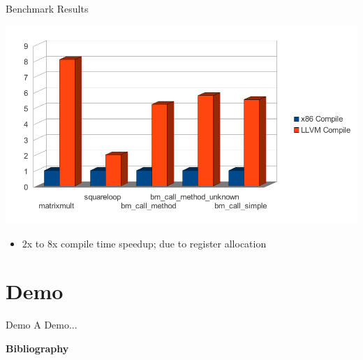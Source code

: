 \documentclass{beamer}
\begin{document}
\begin{frame}{Benchmark Results}
  \begin{center}
    \includegraphics[scale=.63]{./include/pdf/compiletime.pdf}
  \end{center}
  \begin{itemize}
  \item $2$x to $8$x compile time speedup\pause; due to register allocation
  \end{itemize}
\end{frame}

\section{Demo}

\begin{frame}{Demo}
  A Demo...
\end{frame}

\begin{frame}[t,allowframebreaks]{\bf Bibliography}
  \nocite{*}
  \printbibliography
\end{frame}
\end{document}
